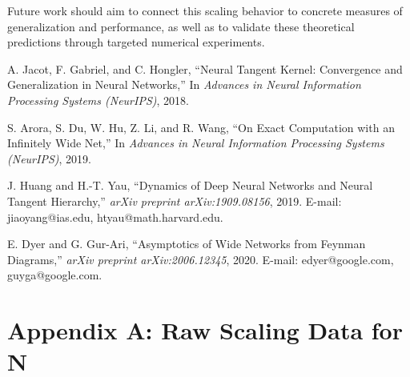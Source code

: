 \documentclass{article}
\begin{document}
Future work should aim to connect this scaling behavior to concrete measures of generalization and performance, as well as to validate these theoretical predictions through targeted numerical experiments.

\newpage

\begin{thebibliography}{11}

    A. Jacot, F. Gabriel, and C. Hongler,
    \newblock ``Neural Tangent Kernel: Convergence and Generalization in Neural Networks,''
    \newblock In \emph{Advances in Neural Information Processing Systems (NeurIPS)}, 2018.
    
    S. Arora, S. Du, W. Hu, Z. Li, and R. Wang,
    \newblock ``On Exact Computation with an Infinitely Wide Net,''
    \newblock In \emph{Advances in Neural Information Processing Systems (NeurIPS)}, 2019.
    
    J. Huang and H.-T. Yau,
    \newblock ``Dynamics of Deep Neural Networks and Neural Tangent Hierarchy,''
    \newblock \emph{arXiv preprint arXiv:1909.08156}, 2019.
    \newblock E-mail: jiaoyang@ias.edu, htyau@math.harvard.edu.
    
    E. Dyer and G. Gur-Ari,
    \newblock ``Asymptotics of Wide Networks from Feynman Diagrams,''
    \newblock \emph{arXiv preprint arXiv:2006.12345}, 2020.
    \newblock E-mail: edyer@google.com, guyga@google.com.
    
    \end{thebibliography}

\newpage
\appendix
\section*{Appendix A: Raw Scaling Data for N}
\end{document}

